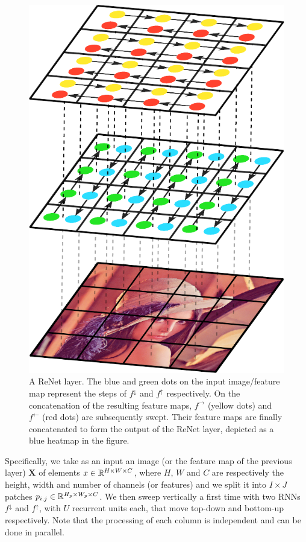\begin{figure}[t]
    \begin{center}
        \includegraphics[width=0.3\columnwidth]{pdf/first_layer.pdf}
        \caption{A ReNet layer. The blue and green dots on the input
            image/feature map represent the steps of $f^{\downarrow}$ and
            $f^{\uparrow}$ respectively. On the concatenation of the resulting
            feature maps, $f^{\rightarrow}$ (yellow dots) and $f^{\leftarrow}$
            (red dots) are subsequently swept. Their feature maps are finally
            concatenated to form the output of the ReNet layer, depicted as a
            blue heatmap in the figure.}
        \label{fig:first_layer}
        \vspace{-5mm}
    \end{center}
\end{figure}


Specifically, we take as an input an image (or the feature map of the previous
layer) $\mathbf{X}$ of elements $x \in \mathbb{R}^{H \times W \times C}$, where $H$,
$W$ and $C$ are respectively the height, width and number of channels (or
features) and we split it into $I \times J$ patches $p_{i,j} \in \mathbb{R}^{H_p
\times W_p \times C}$. We then sweep %
vertically a first time with two RNNs $f^{\downarrow}$ and $f^{\uparrow}$,
with $U$ recurrent units each, that move top-down and bottom-up respectively.
Note that the processing of each column is independent and can be done in
parallel.

